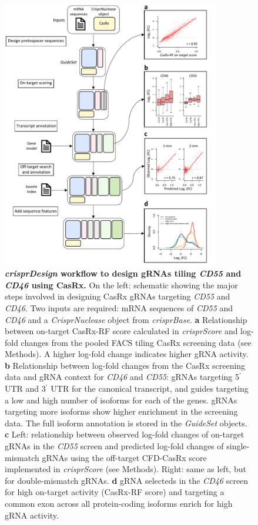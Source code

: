 \documentclass[pdftex,english,10pt]{article}
\begin{document}
\begin{figure}
\centering
\includegraphics[width=0.85\textwidth]{analyses/casrx/sanjana/figures/casrx.pdf}
  \caption{\textbf{\textit{crisprDesign} workflow to design gRNAs tiling \textit{CD55} and \textit{CD46} using CasRx.} 
  On the left: schematic showing the major steps involved in designing CasRx gRNAs targeting \textit{CD55} and \textit{CD46}.
Two inputs are required: mRNA sequences of \textit{CD55} and \textit{CD46} and a 
\textit{CrisprNuclease} object from \textit{crisprBase}. 
\textbf{a} Relationship between on-target CasRx-RF score calculated in \textit{crisprScore} and log-fold changes from the pooled FACS tiling CasRx screening data (see Methods). A higher log-fold change indicates higher gRNA activity.
\textbf{b} Relationship between log-fold changes from the CasRx screening data and gRNA context for \textit{CD46} and \textit{CD55}: gRNAs targeting 5$^\prime$ UTR and 3$^\prime$ UTR for the canonical transcript, and guides targeting a low and high number of isoforms for each of the genes. gRNAs targeting more isoforms show higher enrichment in the screening data. The full isoform annotation is stored in the \textit{GuideSet} objects.
\textbf{c} Left: relationship between observed log-fold changes of on-target gRNAs in the \textit{CD55} screen and predicted log-fold changes of single-mismatch gRNAs using the off-target CFD-CasRx score implemented in \textit{crisprScore} (see Methods). Right: same as left, but for double-mismatch gRNAs.
\textbf{d} gRNA selecteds in the \textit{CD46} screen for high on-target activity (CasRx-RF score) and targeting a common exon across all protein-coding isoforms enrich for high gRNA activity. }
  \label{fig:casrx}
\end{figure}
\end{document}

